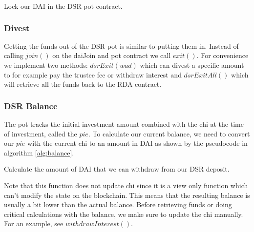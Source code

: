 \documentclass[12pt,a4paper,titlepage,oneside,english]{article}
\begin{document}
\begin{algorithm}[H]
	\label{alg:invest}
	\DontPrintSemicolon
	\caption{Lock our DAI in the DSR pot contract.}
\end{algorithm}


\subsubsection{Divest}

Getting the funds out of the DSR pot is similar to putting them in. Instead of calling $join()$ on the daiJoin and pot contract we call $exit()$. For convenience we implement two methods: $dsrExit(wad)$ which can divest a specific amount to for example pay the trustee fee or withdraw interest and $dsrExitAll()$ which will retrieve all the funds back to the RDA contract.


\subsubsection{DSR Balance}

The pot tracks the initial investment amount combined with the chi at the time of investment, called the $pie$. To calculate our current balance, we need to convert our $pie$ with the current chi to an amount in DAI as shown by the pseudocode in algorithm \ref{alg:balance}.

\begin{algorithm}[H]
	\label{alg:balance}
	\DontPrintSemicolon
	\caption{Calculate the amount of DAI that we can withdraw from our DSR deposit.}
\end{algorithm}

Note that this function does not update chi since it is a view only function which can't modify the state on the blockchain. This means that the resulting balance is usually a bit lower than the actual balance. Before retrieving funds or doing critical calculations with the balance, we make sure to update the chi manually. For an example, see $withdrawInterest()$.
\end{document}
